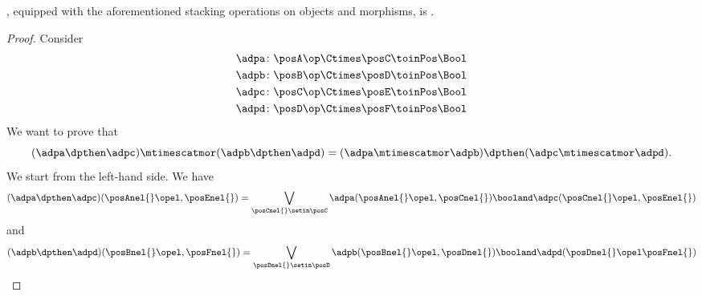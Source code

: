 \begin{lemma}\label{lem:DPL-functorial-stacking}
    \DPL, equipped with the aforementioned stacking operations on objects and morphisms, is .
\end{lemma}

\begin{proof}
    Consider
    \begin{equation}
        \begin{aligned}
            \adpa\colon \posA\op\Ctimes \posC & \toinPos \Bool \\
            \adpb\colon \posB\op\Ctimes \posD & \toinPos \Bool \\
            \adpc\colon \posC\op\Ctimes \posE & \toinPos \Bool \\
            \adpd\colon \posD\op\Ctimes \posF & \toinPos \Bool
        \end{aligned}
    \end{equation}
    We want to prove that
    \begin{equation}
        (\adpa \dpthen \adpc)
        \mtimescatmor (\adpb \dpthen \adpd)=(\adpa \mtimescatmor \adpb) \dpthen (\adpc \mtimescatmor \adpd).
    \end{equation}
    We start from the left-hand side.
    We have
    \begin{equation}
        (\adpa \dpthen \adpc)(\posAnel{}\opel,\posEnel{})
        =\bigvee_{\posCnel{}\setin \posC}
        \adpa(\posAnel{}\opel, \posCnel{}) \booland \adpc(\posCnel{}\opel,\posEnel{})
    \end{equation}
    and
    \begin{equation}
        \begin{aligned}
            (\adpb \dpthen \adpd)(\posBnel{}\opel,\posFnel{})
            =\bigvee_{\posDnel{}\setin \posD}
            \adpb(\posBnel{}\opel, \posDnel{}) \booland \adpd(\posDnel{}\opel\posFnel{})

\end{aligned}
\end{equation}
\end{proof}
